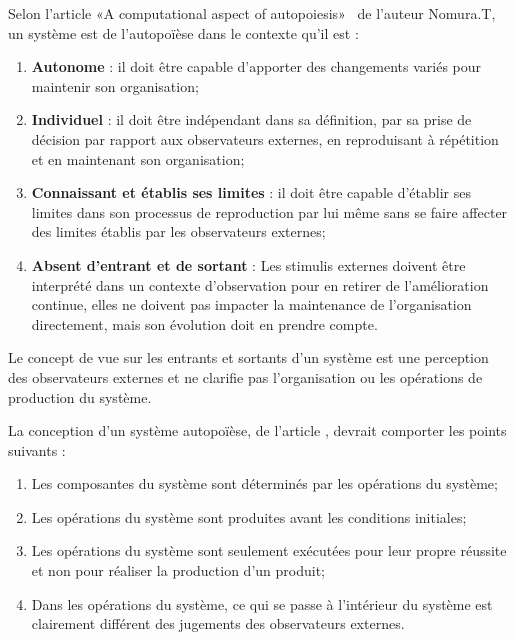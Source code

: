 Selon l'article «A computational aspect of autopoiesis»~\cite{tatsuya_computational_autopoiesis_2000} de l'auteur Nomura.T, un système est de l'autopoïèse dans le contexte qu'il est : 
\begin{enumerate}
    \item \textbf{Autonome} : il doit être capable d'apporter des changements variés pour maintenir son organisation;
    \item \textbf{Individuel} : il doit être indépendant dans sa définition, par sa prise de décision par rapport aux observateurs externes, en reproduisant à répétition et en maintenant son organisation;
    \item \textbf{Connaissant et établis ses limites} : il doit être capable d'établir ses limites dans son processus de reproduction par lui même sans se faire affecter des limites établis par les observateurs externes;
    \item \textbf{Absent d'entrant et de sortant} : Les stimulis externes doivent être interprété dans un contexte d'observation pour en retirer de l'amélioration continue, elles ne doivent pas impacter la maintenance de l'organisation directement, mais son évolution doit en prendre compte.
\end{enumerate}

Le concept de vue sur les entrants et sortants d'un système est une perception des observateurs externes et ne clarifie pas l'organisation ou les opérations de production du système. 



La conception d'un système autopoïèse, de l'article \cite{tatsuya_computational_autopoiesis_2000}, devrait comporter les points suivants : 

\begin{enumerate}
    \item Les composantes du système sont déterminés par les opérations du système;
    \item Les opérations du système sont produites avant les conditions initiales;
    \item Les opérations du système sont seulement exécutées pour leur propre réussite et non pour réaliser la production d'un produit;
    \item Dans les opérations du système, ce qui se passe à l'intérieur du système est clairement différent des jugements des observateurs externes.
\end{enumerate}

